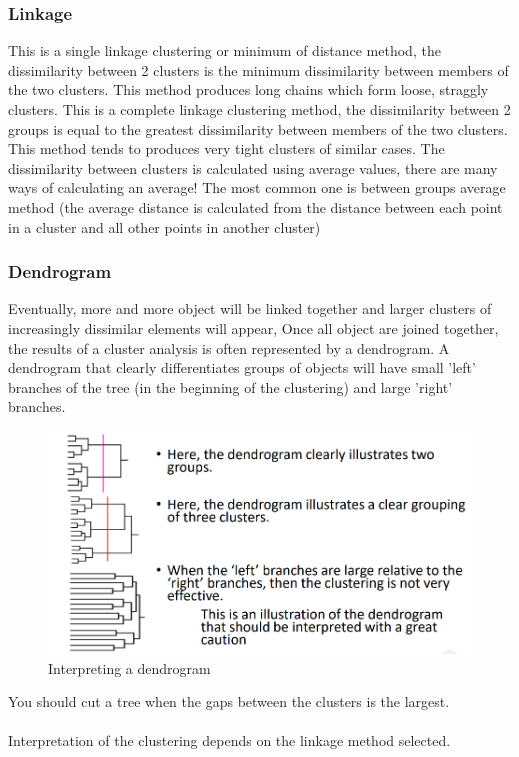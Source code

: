 \subsubsection{Linkage}
This is a single linkage clustering or minimum of distance method, the dissimilarity between 2 clusters is the minimum dissimilarity between members of the two clusters. This method produces long chains which form loose, straggly clusters.
This is a complete linkage clustering method, the dissimilarity between 2 groups is equal to the greatest dissimilarity between members of the two clusters. This method tends to produces very tight clusters of similar cases.
The dissimilarity between clusters is calculated using average values, there are many ways of calculating an average! The most common one is between groups average method (the average distance is calculated from the distance between each point in a cluster and all other points in another cluster) 
\subsubsection{Dendrogram}
Eventually, more and more object will be linked together and larger clusters of increasingly dissimilar elements will appear, Once all object are joined together, the results of a cluster analysis is often represented by a dendrogram.
A dendrogram that clearly differentiates groups of objects will have small 'left' branches of the tree (in the beginning of the clustering) and large 'right' branches. 
\begin{figure}[!htbp]
    \centering
    \includegraphics[width= \textwidth]{Images/Dendrograms.PNG}
    \caption{Interpreting a dendrogram}
    \label{fig:dendrogram}
\end{figure}
\smallskip
You should cut a tree when the gaps between the clusters is the largest.
\\\\
Interpretation of the clustering depends on the linkage method selected.

